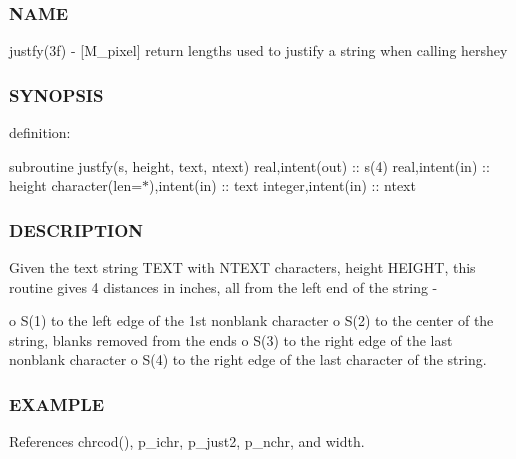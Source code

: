 \subsubsection*{N\+A\+ME}

justfy(3f) -\/ \mbox{[}M\+\_\+pixel\mbox{]} return lengths used to justify a string when calling hershey 

\subsubsection*{S\+Y\+N\+O\+P\+S\+IS}

definition\+:

subroutine justfy(s, height, text, ntext) real,intent(out) \+:\+: s(4) real,intent(in) \+:\+: height character(len=$\ast$),intent(in) \+:\+: text integer,intent(in) \+:\+: ntext

\subsubsection*{D\+E\+S\+C\+R\+I\+P\+T\+I\+ON}

Given the text string T\+E\+XT with N\+T\+E\+XT characters, height H\+E\+I\+G\+HT, this routine gives 4 distances in inches, all from the left end of the string -\/

o S(1) to the left edge of the 1st nonblank character o S(2) to the center of the string, blanks removed from the ends o S(3) to the right edge of the last nonblank character o S(4) to the right edge of the last character of the string.

\subsubsection*{E\+X\+A\+M\+P\+LE}

References chrcod(), p\+\_\+ichr, p\+\_\+just2, p\+\_\+nchr, and width.


